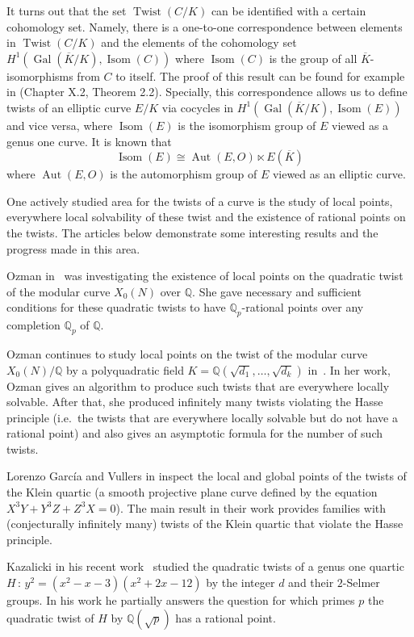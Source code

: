 \documentclass[a4paper, 12pt]{amsart}
\theoremstyle{definition}
\theoremstyle{remark}
\newcommand{\GalK}{\operatorname{Gal}(\overline{K}/K)}
\newcommand{\whichbold}[1]{\mathbb{#1}} %
\newcommand{\Q}{\whichbold{Q}}
\newcommand{\Qp}{\whichbold{Q}_{p}}
\numberwithin{equation}{section}
\begin{document}
It turns out that the set $\operatorname{Twist}(C/K)$ can be identified with a certain cohomology set.
Namely, there is a one-to-one correspondence between elements in $\operatorname{Twist}(C/K)$ and the elements of the cohomology set $H^1\left(\GalK,\operatorname{Isom}(C)\right)$ where $\operatorname{Isom}(C)$ is the group of all $\overline{K}$-isomorphisms from $C$ to itself.
The proof of this result can be found for example in \cite{silverman2009arithmetic} (Chapter X.2, Theorem 2.2). Specially, this correspondence allows us to define twists of an elliptic curve $E/K$ via cocycles in $H^1\left(\GalK,\operatorname{Isom}(E)\right)$ and vice versa, where $\operatorname{Isom}(E)$ is the isomorphism group of $E$ viewed as a genus one curve. It is known that
\[
    \operatorname{Isom}(E) \cong \operatorname{Aut}(E,O) \ltimes E(\overline{K})
\]
where $\operatorname{Aut}(E,O)$ is the automorphism group of $E$ viewed as an elliptic curve.

One actively studied area for the twists of a curve is the study of local points, everywhere local solvability of these twist and the existence of rational points on the twists.  
The articles below demonstrate some interesting results and the progress made in this area.

Ozman in~\cite{MR2890545} was investigating the existence of local points on the quadratic twist of the modular curve $X_0(N)$ over $\Q$. She gave necessary and sufficient conditions for these quadratic twists to have $\Qp$-rational points over any completion $\Qp$ of $\Q$.

 Ozman continues to study local points on the twist of the modular curve $X_0(N)/\Q$ by a polyquadratic field $K=\Q(\sqrt{d_1},\dotso, \sqrt{d_k})$ in~\cite{MR3071815}. In her work, Ozman gives an algorithm to produce such twists that are everywhere locally solvable. After that, she produced infinitely many twists violating the Hasse principle (i.e.\ the twists that are everywhere locally solvable but do not have a rational point) and also gives an asymptotic formula for the number of such twists.

 Lorenzo Garc\'ia and  Vullers in\cite{MR4770972} inspect the local and global points of the twists of the Klein quartic (a smooth projective plane curve defined by the equation $X^3Y+Y^3Z+Z^3X=0$). The main result in their work provides families with (conjecturally infinitely many) twists of the Klein quartic that violate the Hasse principle.

Kazalicki in his recent work~\cite{MR4935708} studied the quadratic twists of a genus one quartic $H\,:\, y^2=(x^2-x-3)(x^2+2x-12)$ by the integer $d$ and their $2$-Selmer groups. In his work he partially answers the question for which primes $p$ the quadratic twist of $H$ by $\Q(\sqrt{p})$ has a rational point.
\end{document}
